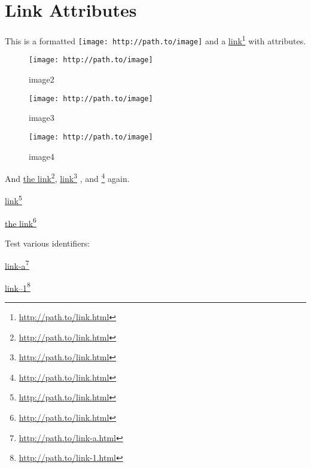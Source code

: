 
\def\mytitle{Link Attributes Test}


\part{Link Attributes}
\label{linkattributes}

This is a formatted \texttt{[image: http://path.to/image]} and a \href{http://path.to/link.html}{link}\footnote{\href{http://path.to/link.html}{http:/\slash path.to\slash link.html}} with attributes.

\begin{figure}[htbp]
\centering
\texttt{[image: http://path.to/image]}
\caption{image2}
\label{image2}
\end{figure}

\begin{figure}[htbp]
\centering
\texttt{[image: http://path.to/image]}
\caption{image3}
\label{image3}
\end{figure}

\begin{figure}[htbp]
\centering
\texttt{[image: http://path.to/image]}
\caption{image4}
\label{image4}
\end{figure}

And \href{http://path.to/link.html}{the link}\footnote{\href{http://path.to/link.html}{http:/\slash path.to\slash link.html}}, \href{http://path.to/link.html}{link}\footnote{\href{http://path.to/link.html}{http:/\slash path.to\slash link.html}} , and \href{http://path.to/link.html}{}\footnote{\href{http://path.to/link.html}{http:/\slash path.to\slash link.html}} again.

\href{http://path.to/link.html}{link}\footnote{\href{http://path.to/link.html}{http:/\slash path.to\slash link.html}}

\href{http://path.to/link.html}{the link}\footnote{\href{http://path.to/link.html}{http:/\slash path.to\slash link.html}}

Test various identifiers:

\href{http://path.to/link-a.html}{link-{}a}\footnote{\href{http://path.to/link-a.html}{http:/\slash path.to\slash link-{}a.html}}

\href{http://path.to/link-1.html}{link--1}\footnote{\href{http://path.to/link-1.html}{http:/\slash path.to\slash link-{}1.html}}

